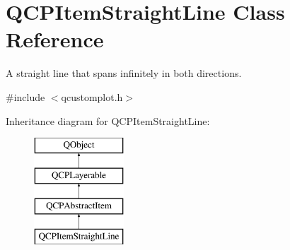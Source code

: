 \hypertarget{class_q_c_p_item_straight_line}{}\section{Q\+C\+P\+Item\+Straight\+Line Class Reference}
\label{class_q_c_p_item_straight_line}


A straight line that spans infinitely in both directions.  




{\ttfamily \#include $<$qcustomplot.\+h$>$}

Inheritance diagram for Q\+C\+P\+Item\+Straight\+Line\+:\begin{figure}[H]
\begin{center}
\leavevmode
\includegraphics[height=4.000000cm]{d0/d2a/class_q_c_p_item_straight_line}
\end{center}
\end{figure}
